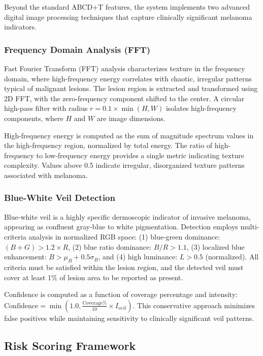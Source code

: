 \documentclass[conference]{IEEEtran}
\begin{document}
Beyond the standard ABCD+T features, the system implements two advanced digital image processing techniques that capture clinically significant melanoma indicators.

\subsubsection{Frequency Domain Analysis (FFT)}

Fast Fourier Transform (FFT) analysis characterizes texture in the frequency domain, where high-frequency energy correlates with chaotic, irregular patterns typical of malignant lesions. The lesion region is extracted and transformed using 2D FFT, with the zero-frequency component shifted to the center. A circular high-pass filter with radius $r = 0.1 \times \min(H, W)$ isolates high-frequency components, where $H$ and $W$ are image dimensions.

High-frequency energy is computed as the sum of magnitude spectrum values in the high-frequency region, normalized by total energy. The ratio of high-frequency to low-frequency energy provides a single metric indicating texture complexity. Values above 0.5 indicate irregular, disorganized texture patterns associated with melanoma.

\subsubsection{Blue-White Veil Detection}

Blue-white veil is a highly specific dermoscopic indicator of invasive melanoma, appearing as confluent gray-blue to white pigmentation. Detection employs multi-criteria analysis in normalized RGB space: (1) blue-green dominance: $(B + G) > 1.2 \times R$, (2) blue ratio dominance: $B/R > 1.1$, (3) localized blue enhancement: $B > \mu_B + 0.5\sigma_B$, and (4) high luminance: $L > 0.5$ (normalized). All criteria must be satisfied within the lesion region, and the detected veil must cover at least 1\% of lesion area to be reported as present.

Confidence is computed as a function of coverage percentage and intensity: $\text{Confidence} = \min(1.0, \frac{\text{Coverage\%}}{10} \times I_{veil})$. This conservative approach minimizes false positives while maintaining sensitivity to clinically significant veil patterns.

\subsection{Risk Scoring Framework}
\end{document}

